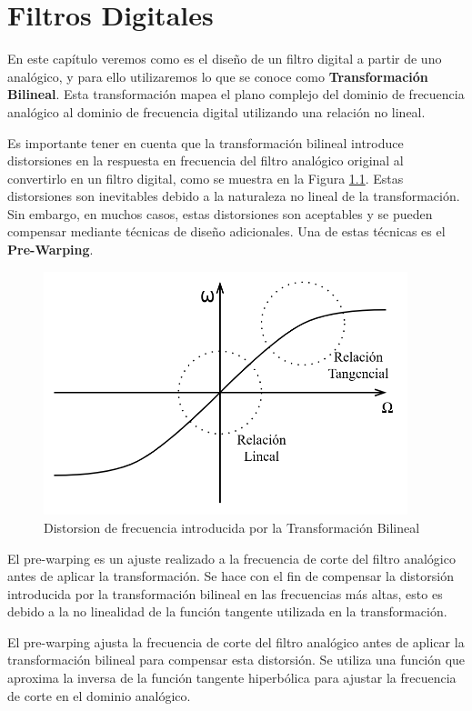 \chapter{Filtros Digitales}

En este capítulo veremos como es el diseño de un filtro digital a partir de uno analógico, y para ello utilizaremos lo que se conoce como \textbf{Transformación Bilineal}. Esta transformación mapea el plano complejo del dominio de frecuencia analógico al dominio de frecuencia digital utilizando una relación no lineal.

Es importante tener en cuenta que la transformación bilineal introduce distorsiones en la respuesta en frecuencia del filtro analógico original al convertirlo en un filtro digital, como se muestra en la Figura \ref{fig:distorsion_frecuencia_angular}. Estas distorsiones son inevitables debido a la naturaleza no lineal de la transformación. Sin embargo, en muchos casos, estas distorsiones son aceptables y se pueden compensar mediante técnicas de diseño adicionales. Una de estas técnicas es el \textbf{Pre-Warping}.

\begin{figure}[H]
  \centering
  \includegraphics[width=300pt]{images/diagramas-distorsion-frecuencia-angular.png}
  \caption{Distorsion de frecuencia introducida por la Transformación Bilineal}
  \label{fig:distorsion_frecuencia_angular}
\end{figure}

El pre-warping es un ajuste realizado a la frecuencia de corte del filtro analógico antes de aplicar la transformación. Se hace con el fin de compensar la distorsión introducida por la transformación bilineal en las frecuencias más altas, esto es debido a la no linealidad de la función tangente utilizada en la transformación.

El pre-warping ajusta la frecuencia de corte del filtro analógico antes de aplicar la transformación bilineal para compensar esta distorsión. Se utiliza una función que aproxima la inversa de la función tangente hiperbólica para ajustar la frecuencia de corte en el dominio analógico.

